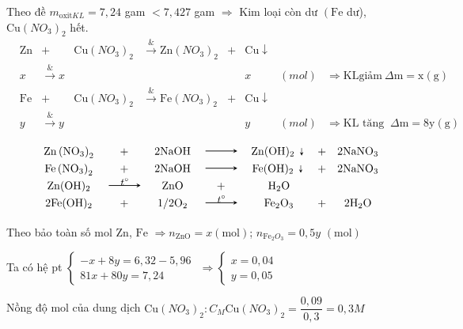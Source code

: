 \begin{vd}
{			Theo đề $m_{\text{oxit} KL}=7,24$ gam $< 7,427$ gam $\Rightarrow$ Kim loại còn dư $\left(\mathrm{Fe}\right.$ dư), $\mathrm{Cu}\left(NO_3\right)_2$ hết.
			\[\begin{array}{cccccccccc}
					& \mathrm{Zn}&+&\mathrm{Cu}\left(NO_3\right)_2 &\xrightarrow& \mathrm{Zn}\left(NO_3\right)_2&+&\mathrm{Cu} \downarrow &&\\
					& x &\xrightarrow &x&&&&x& (mol)&\Rightarrow \mathrm{KL}\text{giảm}\ \Delta \mathrm{m}=\mathrm{x}(\mathrm{g})\\
					& \mathrm{Fe}&+&\mathrm{Cu}\left(NO_3\right)_2 &\xrightarrow& \mathrm{Fe}\left(NO_3\right)_2&+&\mathrm{Cu} \downarrow &&\\
					& y &\xrightarrow& y&&&&y& (mol)&\Rightarrow \mathrm{KL} \text { tăng }\ \Delta \mathrm{m}=8 \mathrm{y}(\mathrm{g}) \\
			\end{array}\]
			\[\begin{array}{cccccccc}
				& \mathrm{Zn}\left(\mathrm{NO}_3\right)_2&+&2 \mathrm{NaOH} &\xrightarrow& \mathrm{Zn}(\mathrm{OH})_2 \downarrow&+&2 \mathrm{NaNO}_3 \\
				& \mathrm{Fe}\left(\mathrm{NO}_3\right)_2&+&2 \mathrm{NaOH} &\xrightarrow& \mathrm{Fe}(\mathrm{OH})_2 \downarrow&+&2 \mathrm{NaNO}_3 \\
				& \mathrm{Zn}(\mathrm{OH})_2 &\xrightarrow[$t^\circ$]& \mathrm{ZnO}&+&\mathrm{H}_2\mathrm{O}&& \\
				& 2\mathrm{Fe}(\mathrm{OH})_2&+&1/2 \mathrm{O}_2 &\xrightarrow[$t^\circ$]& \mathrm{Fe}_2 \mathrm{O}_3&+&2 \mathrm{H}_2\mathrm{O}
			\end{array}\]
			
			Theo bảo toàn số $\mathrm{mol}$ $\mathrm{Zn}$, $\mathrm{Fe}$ $\Rightarrow n_{\mathrm{ZnO}}=x(\mathrm{mol})$; $n_{\mathrm{Fe}_2 O_3}=0,5y$  $(\mathrm{mol})$
			
			Ta có hệ pt $\left\{\begin{array}{l}-x+8y=6,32-5,96\\ 81x+80y=7,24\end{array}\right.$ $\Rightarrow\left\{\begin{array}{l}x=0,04\\ y=0,05\end{array}\right.$
			
			Nồng độ mol của dung dịch $\mathrm{Cu}\left(NO_3\right)_2: C_M \mathrm{Cu}\left(NO_3\right)_2=\dfrac{0,09}{0,3}=0,3M$
			
	}
\end{vd}


